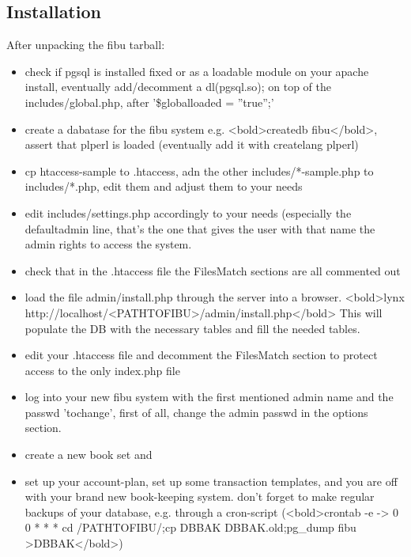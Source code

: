 \subsection{Installation}

After unpacking the fibu tarball: 

\begin{itemize}

\item  check if pgsql is installed fixed or as a loadable module on your apache
install, eventually add/decomment a dl(pgsql.so); on top of the
includes/global.php, after '\$globalloaded = ''true'';'

\item  create a dabatase for the fibu system
  e.g. <bold>createdb fibu</bold>, assert that plperl is loaded (eventually add it with createlang plperl)

\item  cp htaccess-sample to .htaccess, adn the other includes/*-sample.php to includes/*.php, edit them and adjust them to your needs

\item  edit includes/settings.php accordingly to your needs (especially the
  defaultadmin line, that's the one that gives the user with that name the
  admin rights to access the system.

\item  check that in the .htaccess file the FilesMatch sections are all commented out

\item  load the file admin/install.php through the server into a browser.
  <bold>lynx http://localhost/<PATHTOFIBU>/admin/install.php</bold>
  This will populate the DB with the necessary tables and fill the needed tables.

\item  edit your .htaccess file and decomment the FilesMatch section to protect access to the only index.php file

\item  log into your new fibu system with the first mentioned admin name and the
  passwd 'tochange', first of all, change the admin passwd in the options
  section. 

\item  create a new book set and

\item  set up your account-plan, set up some transaction templates, and you are off
with your brand new book-keeping system. don't forget to make regular backups
of your database, e.g. through a cron-script (<bold>crontab -e -> 0 0 * * * cd
                /PATHTOFIBU/;cp DBBAK DBBAK.old;pg\_dump fibu >DBBAK</bold>)
\end{itemize}

